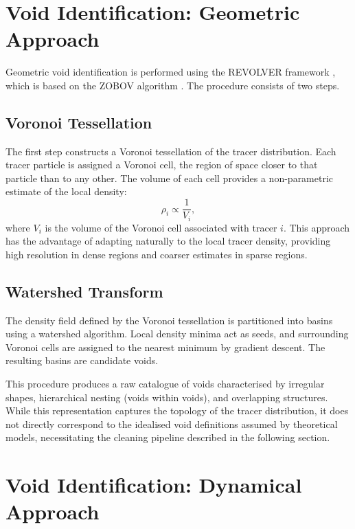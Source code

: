 \documentclass[12pt]{report}
\begin{document}
\section{Void Identification: Geometric Approach}
\label{sec:geometric_id}

Geometric void identification is performed using the REVOLVER framework \citep{Nadathur2019}, which is based on the ZOBOV algorithm \citep{Neyrinck2008}. The procedure consists of two steps.

\subsection{Voronoi Tessellation}

The first step constructs a Voronoi tessellation of the tracer distribution. Each tracer particle is assigned a Voronoi cell, the region of space closer to that particle than to any other. The volume of each cell provides a non-parametric estimate of the local density:
\begin{equation}
    \rho_i \propto \frac{1}{V_i}
    \label{eq:voronoi_density},
\end{equation}
where $V_i$ is the volume of the Voronoi cell associated with tracer $i$. This approach has the advantage of adapting naturally to the local tracer density, providing high resolution in dense regions and coarser estimates in sparse regions.

\subsection{Watershed Transform}

The density field defined by the Voronoi tessellation is partitioned into basins using a watershed algorithm. Local density minima act as seeds, and surrounding Voronoi cells are assigned to the nearest minimum by gradient descent. The resulting basins are candidate voids.

This procedure produces a raw catalogue of voids characterised by irregular shapes, hierarchical nesting (voids within voids), and overlapping structures. While this representation captures the topology of the tracer distribution, it does not directly correspond to the idealised void definitions assumed by theoretical models, necessitating the cleaning pipeline described in the following section.


\section{Void Identification: Dynamical Approach}
\label{sec:dynamical_id}
\end{document}
